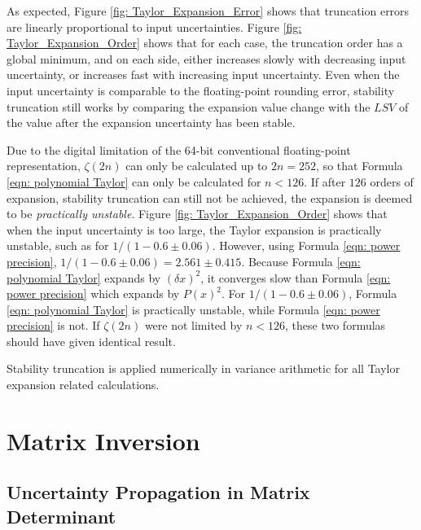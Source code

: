 \documentclass[twoside]{article}
\numberwithin{equation}{section}
\begin{document}
As expected, Figure \ref{fig: Taylor_Expansion_Error} shows that truncation errors are linearly proportional to input uncertainties.
Figure \ref{fig: Taylor_Expansion_Order} shows that for each case, the truncation order has a global minimum, and on each side, either increases slowly with decreasing input uncertainty, or increases fast with increasing input uncertainty.
Even when the input uncertainty is comparable to the floating-point rounding error, stability truncation still works by comparing the expansion value change with the $LSV$ of the value after the expansion uncertainty has been stable.

Due to the digital limitation of the 64-bit conventional floating-point representation, $\zeta(2n)$ can only be calculated up to $2n = 252$, so that Formula \eqref{eqn: polynomial Taylor} can only be calculated for $n < 126$.
If after $126$ orders of expansion, stability truncation can still not be achieved, the expansion is deemed to be \emph{practically unstable}.
Figure \ref{fig: Taylor_Expansion_Order} shows that when the input uncertainty is too large, the Taylor expansion is practically unstable, such as for $1/(1 - 0.6 \pm 0.06)$.
However, using Formula \eqref{eqn: power precision}, $1/(1 - 0.6 \pm 0.06) = 2.561 \pm 0.415$.
Because Formula \eqref{eqn: polynomial Taylor} expands by $(\delta x)^2$, it converges slow than Formula \eqref{eqn: power precision} which expands by $P(x)^2$.
For $1/(1 - 0.6 \pm 0.06)$,  Formula \eqref{eqn: polynomial Taylor} is practically unstable, while  Formula \eqref{eqn: power precision} is not.
If $\zeta(2n)$ were not limited by $n < 126$, these two formulas should have given identical result.

Stability truncation is applied numerically in variance arithmetic for all Taylor expansion related calculations. 





\clearpage
\section{Matrix Inversion}
\label{sec: matrix}


\subsection{Uncertainty Propagation in Matrix Determinant}

\iffalse
\end{document}
